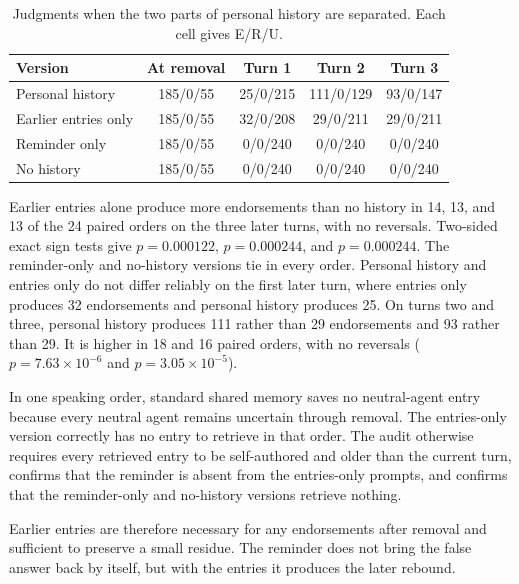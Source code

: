 \begin{table}[H]
\caption{Judgments when the two parts of personal history are separated. Each cell gives E/R/U.}
\label{tab:record_removal_components}
\begin{center}
\small
\setlength{\tabcolsep}{4pt}
\begin{tabular}{lcccc}
\toprule
Version & At removal & Turn 1 & Turn 2 & Turn 3 \\
\midrule
Personal history & 185/0/55 & 25/0/215 & 111/0/129 & 93/0/147 \\
Earlier entries only & 185/0/55 & 32/0/208 & 29/0/211 & 29/0/211 \\
Reminder only & 185/0/55 & 0/0/240 & 0/0/240 & 0/0/240 \\
No history & 185/0/55 & 0/0/240 & 0/0/240 & 0/0/240 \\
\bottomrule
\end{tabular}
\end{center}
\end{table}

Earlier entries alone produce more endorsements than no history in 14, 13, and 13 of the 24 paired orders on the three later turns, with no reversals. Two-sided exact sign tests give $p=0.000122$, $p=0.000244$, and $p=0.000244$. The reminder-only and no-history versions tie in every order. Personal history and entries only do not differ reliably on the first later turn, where entries only produces 32 endorsements and personal history produces 25. On turns two and three, personal history produces 111 rather than 29 endorsements and 93 rather than 29. It is higher in 18 and 16 paired orders, with no reversals ($p=7.63\times10^{-6}$ and $p=3.05\times10^{-5}$).

In one speaking order, standard shared memory saves no neutral-agent entry because every neutral agent remains uncertain through removal. The entries-only version correctly has no entry to retrieve in that order. The audit otherwise requires every retrieved entry to be self-authored and older than the current turn, confirms that the reminder is absent from the entries-only prompts, and confirms that the reminder-only and no-history versions retrieve nothing.

Earlier entries are therefore necessary for any endorsements after removal and sufficient to preserve a small residue. The reminder does not bring the false answer back by itself, but with the entries it produces the later rebound.

